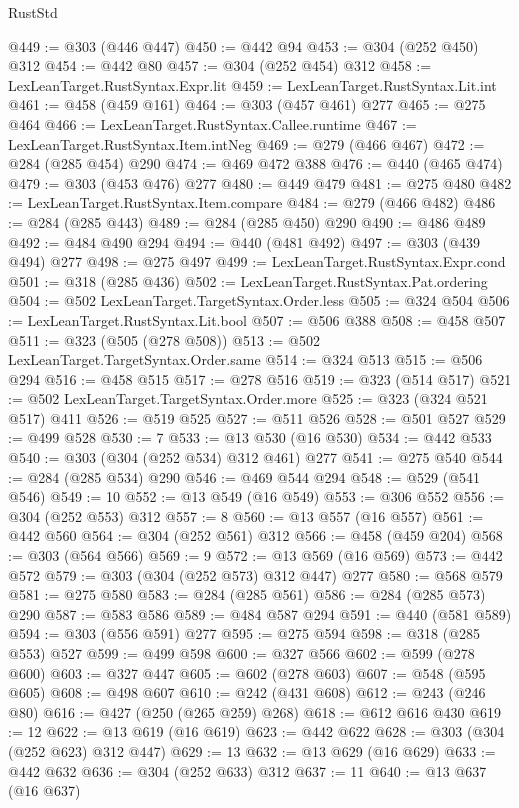 \begin{lexlean}{RustStd}
\begin{coremodule}
{\begin{coremodule}
{{{{{{{{@449 := @303 (@446 @447)
@450 := @442 @94
@453 := @304 (@252 @450) @312
@454 := @442 @80
@457 := @304 (@252 @454) @312
@458 := LexLeanTarget.RustSyntax.Expr.lit
@459 := LexLeanTarget.RustSyntax.Lit.int
@461 := @458 (@459 @161)
@464 := @303 (@457 @461) @277
@465 := @275 @464
@466 := LexLeanTarget.RustSyntax.Callee.runtime
@467 := LexLeanTarget.RustSyntax.Item.intNeg
@469 := @279 (@466 @467)
@472 := @284 (@285 @454) @290
@474 := @469 @472 @388
@476 := @440 (@465 @474)
@479 := @303 (@453 @476) @277
@480 := @449 @479
@481 := @275 @480
@482 := LexLeanTarget.RustSyntax.Item.compare
@484 := @279 (@466 @482)
@486 := @284 (@285 @443)
@489 := @284 (@285 @450) @290
@490 := @486 @489
@492 := @484 @490 @294
@494 := @440 (@481 @492)
@497 := @303 (@439 @494) @277
@498 := @275 @497
@499 := LexLeanTarget.RustSyntax.Expr.cond
@501 := @318 (@285 @436)
@502 := LexLeanTarget.RustSyntax.Pat.ordering
@504 := @502 LexLeanTarget.TargetSyntax.Order.less
@505 := @324 @504
@506 := LexLeanTarget.RustSyntax.Lit.bool
@507 := @506 @388
@508 := @458 @507
@511 := @323 (@505 (@278 @508))
@513 := @502 LexLeanTarget.TargetSyntax.Order.same
@514 := @324 @513
@515 := @506 @294
@516 := @458 @515
@517 := @278 @516
@519 := @323 (@514 @517)
@521 := @502 LexLeanTarget.TargetSyntax.Order.more
@525 := @323 (@324 @521 @517) @411
@526 := @519 @525
@527 := @511 @526
@528 := @501 @527
@529 := @499 @528
@530 := 7
@533 := @13 @530 (@16 @530)
@534 := @442 @533
@540 := @303 (@304 (@252 @534) @312 @461) @277
@541 := @275 @540
@544 := @284 (@285 @534) @290
@546 := @469 @544 @294
@548 := @529 (@541 @546)
@549 := 10
@552 := @13 @549 (@16 @549)
@553 := @306 @552
@556 := @304 (@252 @553) @312
@557 := 8
@560 := @13 @557 (@16 @557)
@561 := @442 @560
@564 := @304 (@252 @561) @312
@566 := @458 (@459 @204)
@568 := @303 (@564 @566)
@569 := 9
@572 := @13 @569 (@16 @569)
@573 := @442 @572
@579 := @303 (@304 (@252 @573) @312 @447) @277
@580 := @568 @579
@581 := @275 @580
@583 := @284 (@285 @561)
@586 := @284 (@285 @573) @290
@587 := @583 @586
@589 := @484 @587 @294
@591 := @440 (@581 @589)
@594 := @303 (@556 @591) @277
@595 := @275 @594
@598 := @318 (@285 @553) @527
@599 := @499 @598
@600 := @327 @566
@602 := @599 (@278 @600)
@603 := @327 @447
@605 := @602 (@278 @603)
@607 := @548 (@595 @605)
@608 := @498 @607
@610 := @242 (@431 @608)
@612 := @243 (@246 @80)
@616 := @427 (@250 (@265 @259) @268)
@618 := @612 @616 @430
@619 := 12
@622 := @13 @619 (@16 @619)
@623 := @442 @622
@628 := @303 (@304 (@252 @623) @312 @447)
@629 := 13
@632 := @13 @629 (@16 @629)
@633 := @442 @632
@636 := @304 (@252 @633) @312
@637 := 11
@640 := @13 @637 (@16 @637)
}}}}}}}}
\end{coremodule}}
\end{coremodule}
\end{lexlean}
